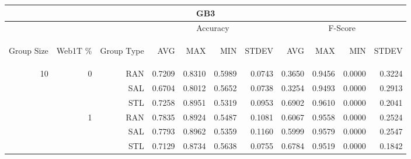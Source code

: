 \begin{center}
\begin{table}[htbp] 
 \begin{center}
\begin{tabular}{ | r | r | r | r | r | r | r | r | r | r | r |}
\hline
\multicolumn{11}{|c|}{GB3}\\
\hline
 & & & \multicolumn{4}{|c|}{Accuracy} & \multicolumn{4}{|c|}{F-Score}\\ \cline{4-11}
\begin{sideways}Group Size\end{sideways} & \begin{sideways}Web1T \%\end{sideways} & \begin{sideways}Group Type\end{sideways} & \begin{sideways}AVG\end{sideways} & \begin{sideways}MAX\end{sideways} & \begin{sideways}MIN\end{sideways} & \begin{sideways}STDEV\end{sideways} & \begin{sideways}AVG\end{sideways} & \begin{sideways}MAX\end{sideways} & \begin{sideways}MIN\end{sideways} & \begin{sideways}STDEV\end{sideways}\\
\hline
\multirow{18}{*}{10}
 & \multirow{3}{*}{0} & RAN & 0.7209 & 0.8310 & 0.5989 & 0.0743 & 0.3650 & 0.9456 & 0.0000 & 0.3224\\ \cline{3-11}
 &   & SAL & 0.6704 & 0.8012 & 0.5652 & 0.0738 & 0.3254 & 0.9493 & 0.0000 & 0.2913\\ \cline{3-11}
 &   & STL & 0.7258 & 0.8951 & 0.5319 & 0.0953 & 0.6902 & 0.9610 & 0.0000 & 0.2041\\ \cline{2-11}
 & \multirow{3}{*}{1} & RAN & 0.7835 & 0.8924 & 0.5487 & 0.1081 & 0.6067 & 0.9558 & 0.0000 & 0.2524\\ \cline{3-11}
 &   & SAL & 0.7793 & 0.8962 & 0.5359 & 0.1160 & 0.5999 & 0.9579 & 0.0000 & 0.2547\\ \cline{3-11}
 &   & STL & 0.7129 & 0.8734 & 0.5638 & 0.0755 & 0.6784 & 0.9519 & 0.0000 & 0.1842\\ \cline{2-11}

\end{tabular}
\end{center}
\end{table}
\end{center}
